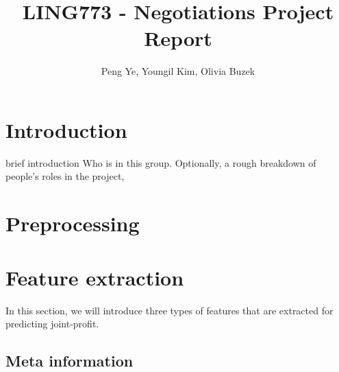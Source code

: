 \documentclass[11pt]{article} %
\title{LING773 - Negotiations Project Report}
\author{Peng Ye, Youngil Kim, Olivia Buzek}
\begin{document}
\maketitle


\section{Introduction}
brief introduction
Who is in this group. Optionally, a rough breakdown of people's roles in the project,
\section{Preprocessing}

\section{Feature extraction}
In this section, we will introduce three types of features that are extracted for predicting joint-profit.
\subsection{Meta information}
\end{document}
